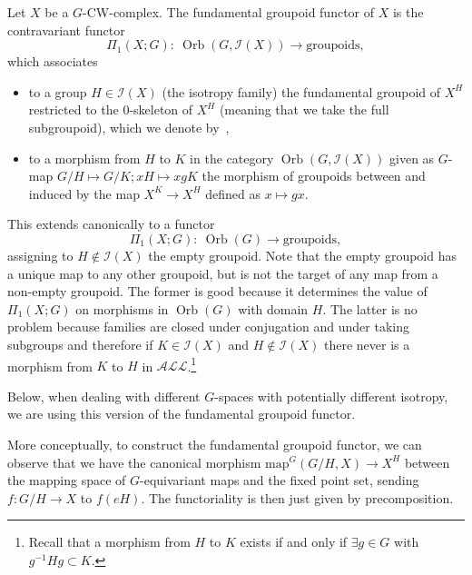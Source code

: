 \documentclass[pdftex]{sigma}
\numberwithin{equation}{section}
\DeclareMathOperator{\Orb}{Orb}
\begin{document}
	\begin{Definition}
		Let $X$ be a $G$-CW-complex. The fundamental groupoid functor of $X$ is the contravariant functor
		\[
		\Pi_1(X;G)\colon\ \Orb(G,\mathcal{I}(X))\to \text{groupoids},
		\]
		which associates
		\begin{itemize}\itemsep=0pt
			\item to a group $H\in \mathcal{I}(X)$ (the isotropy
			family) the fundamental groupoid of $X^H$ restricted
			to the $0$-skeleton of $X^H$ (meaning that we take
			the full subgroupoid), which we denote by~,
			\item to a morphism from $H$ to $K$ in
			the category $\Orb(G,\mathcal{I}(X))$ given as $G$-map
			$G/H\mapsto G/K; xH\mapsto xgK$ the morphism of groupoids between
			 and  induced by the map
			$X^K\to X^H$ defined as $x\mapsto gx$.
		\end{itemize}
		
		This extends canonically to a functor
		\begin{equation*}
			\Pi_1(X;G)\colon\ \Orb(G)\to \text{groupoids},
		\end{equation*}
		assigning to $H\notin \mathcal{I}(X)$ the empty groupoid. Note that the empty groupoid has a unique
		map to any other groupoid, but is not the target of any map from a non-empty
		groupoid. The former is good because it determines the value of $\Pi_1(X;G)$
		on morphisms in $\Orb(G)$ with domain $H$. The latter is no problem because
		families are closed under conjugation and under taking
		subgroups and therefore if $K\in \mathcal{I}(X)$ and $H\notin\mathcal{I}(X)$
		there never is a morphism from $K$ to $H$ in $\mathcal{ALL}$.\footnote{Recall
			that a morphism from $H$ to $K$ exists if and only if $\exists g\in G$ with
			$g^{-1}Hg\subset K$.}
		
		Below, when dealing with different $G$-spaces with potentially
		different isotropy, we are using this version of the fundamental groupoid functor.
	\end{Definition}
	
	\begin{Remark}
		More conceptually, to construct the fundamental groupoid functor, we can
		observe that we have the canonical morphism $\mathrm{map}^G(G/H, X)\to X^H$ between
		the mapping space of $G$-equivariant maps and the fixed point set, sending
		$f\colon G/H\to X$ to $f(eH)$. The functoriality is then just given by
		precomposition.
	\end{Remark}
	
\end{document}
